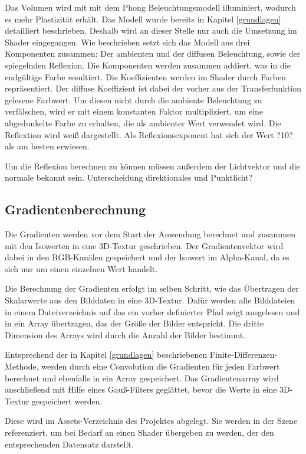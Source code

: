 Das Volumen wird mit mit dem Phong Beleuchtungsmodell illuminiert, wodurch es mehr Plastizität erhält. Das Modell wurde bereits in Kapitel \ref{grundlagen} detailliert beschrieben. Deshalb wird an dieser Stelle nur auch die Umsetzung im Shader eingegangen.
Wie beschrieben setzt sich das Modell aus drei Komponenten zusammen: Der ambienten und der diffusen Beleuchtung, sowie der spiegelnden Reflexion. Die Komponenten werden zusammen addiert, was in die endgültige Farbe resultiert. 
Die Koeffizienten werden im Shader durch Farben repräsentiert. Der diffuse Koeffizient ist dabei der vorher aus der Transferfunktion gelesene Farbwert. Um diesen nicht durch die ambiente Beleuchtung zu verfälschen, wird er mit einem konstanten Faktor multipliziert, um eine abgedunkelte Farbe zu erhalten, die als ambienter Wert verwendet wird. Die Reflextion wird weiß dargestellt.
Als Reflexionsexponent hat sich der Wert ?10? als am besten erwiesen.

Um die Reflexion berechnen zu können müssen außerdem der Lichtvektor und die normale bekannt sein.
Unterscheidung direktionales und Punktlicht?

\subsection{Gradientenberechnung}
\label{gradienten}


Die Gradienten werden vor dem Start der Anwendung berechnet und zusammen mit den Isowerten in eine 3D-Textur geschrieben. Der Gradientenvektor wird dabei in den RGB-Kanälen gespeichert und der Isowert im Alpha-Kanal, da es sich nur um einen einzelnen Wert handelt. 

Die Berechnung der Gradienten erfolgt im selben Schritt, wie das Übertragen der Skalarwerte aus den Bilddaten in eine 3D-Textur.
Dafür werden alle Bilddateien in einem Dateiverzeichnis auf das ein vorher definierter Pfad zeigt ausgelesen und in ein Array übertragen, das der Größe der Bilder entspricht. Die dritte Dimension des Arrays wird durch die Anzahl der Bilder bestimmt. 

Entsprechend der in Kapitel \ref{grundlagen} beschriebenen Finite-Differenzen-Methode, werden durch eine Convolution die Gradienten für jeden Farbwert berechnet und ebenfalls in ein Array gespeichert.
Das Gradientenarray wird anschließend mit Hilfe eines Gauß-Filters geglättet, bevor die Werte in eine 3D-Textur gespeichert werden. 

Diese wird im Assets-Verzeichnis des Projektes abgelegt. Sie werden in der Szene referenziert, um bei Bedarf an einen Shader übergeben zu werden, der den entsprechenden Datensatz darstellt. 